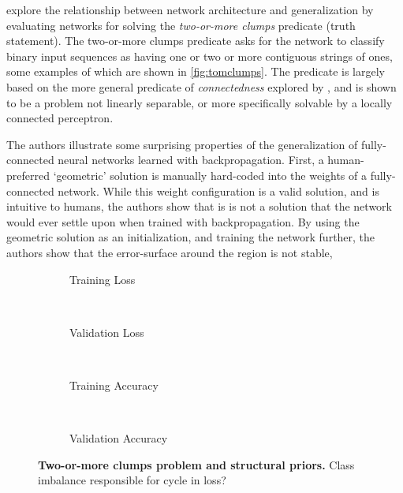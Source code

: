 \documentclass[thesis]{subfiles}
\begin{document}
	\citet{denker1987large,giles1987learning} explore the relationship between network architecture and generalization by evaluating networks for solving the \emph{two-or-more clumps} predicate (truth statement). The two-or-more clumps predicate asks for the network to classify binary input sequences as having one or two or more contiguous strings of ones, some examples of which are shown in \cref{fig:tomclumps}. The predicate is largely based on the more general predicate of \emph{connectedness} explored by \citet{minsky1988perceptrons}, and is shown to be a problem not linearly separable, or more specifically solvable by a locally connected perceptron. 
	
	The authors illustrate some surprising properties of the generalization of fully-connected neural networks learned with backpropagation. First, a human-preferred `geometric' solution is manually hard-coded into the weights of a fully-connected network. While this weight configuration is a valid solution, and is intuitive to humans, the authors show that is is not a solution that the network would ever settle upon when trained with backpropagation. By using the geometric solution as an initialization, and training the network further, the authors show that the error-surface around the region is not stable,
	
	\begin{figure}[tb]
		\centering
		\begin{subfigure}[t]{0.49\textwidth}
			\resizebox{\linewidth}{!}{}
			\caption{Training Loss}
			\label{fig:tomplotmintrainloss}
		\end{subfigure}
		~
		\begin{subfigure}[t]{0.49\textwidth}
			\resizebox{\linewidth}{!}{}
			\caption{Validation Loss}
			\label{fig:tomplotminvalloss}
		\end{subfigure}\\
		\begin{subfigure}[t]{0.49\textwidth}
			\resizebox{\linewidth}{!}{}
			\caption{Training Accuracy}
			\label{fig:tomplotmaxtrainacc}
		\end{subfigure}
		~
		\begin{subfigure}[t]{0.49\textwidth}
			\resizebox{\linewidth}{!}{}
			\caption{Validation Accuracy}
			\label{fig:tomplotmaxvalacc}
		\end{subfigure}
		\caption[Two-or-more clumps problem and structural priors]{\textbf{Two-or-more clumps problem and structural priors.} Class imbalance responsible for cycle in loss?}
		\label{fig:tomplot}
	\end{figure}
\end{document}
